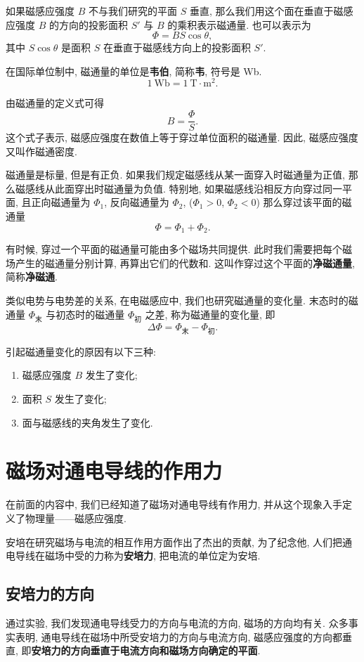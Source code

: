 \documentclass[UTF8,openany,fontset=fandol]{ctexbook}
\theoremstyle{chinesetextbook}
\newcommand{\unit}[1]{\ \mathrm{#1}}
\begin{document}
如果磁感应强度 $B$ 不与我们研究的平面 $S$ 垂直, 那么我们用这个面在垂直于磁感应强度 $B$ 的方向的投影面积 $S'$ 与 $B$ 的乘积表示磁通量. 也可以表示为
\[
\Phi=BS\cos\theta,
\]
其中 $S\cos\theta$ 是面积 $S$ 在垂直于磁感线方向上的投影面积 $S'$.

在国际单位制中, 磁通量的单位是\textbf{韦伯}, 简称\textbf{韦}, 符号是 Wb.
\[
1\unit{Wb}=1\unit{{T}\cdot{m^2}}.
\]

由磁通量的定义式可得
\[
B=\frac{\Phi}{S}.
\]
这个式子表示, 磁感应强度在数值上等于穿过单位面积的磁通量. 因此, 磁感应强度又叫作磁通密度.

磁通量是标量, 但是有正负. 如果我们规定磁感线从某一面穿入时磁通量为正值, 那么磁感线从此面穿出时磁通量为负值. 特别地, 如果磁感线沿相反方向穿过同一平面, 且正向磁通量为 $\Phi_1$, 反向磁通量为 $\Phi_2$, ($\Phi_1>0$, $\Phi_2<0$) 那么穿过该平面的磁通量
\[
\Phi=\Phi_1+\Phi_2.
\]

有时候, 穿过一个平面的磁通量可能由多个磁场共同提供. 此时我们需要把每个磁场产生的磁通量分别计算, 再算出它们的代数和. 这叫作穿过这个平面的\textbf{净磁通量}, 简称\textbf{净磁通}.

类似电势与电势差的关系, 在电磁感应中, 我们也研究磁通量的变化量. 末态时的磁通量 $\Phi_\text{末}$ 与初态时的磁通量 $\Phi_\text{初}$ 之差, 称为磁通量的变化量, 即
\[
\Delta\Phi=\Phi_\text{末}-\Phi_\text{初}.
\]

引起磁通量变化的原因有以下三种:
\begin{enumerate}
\item 磁感应强度 $B$ 发生了变化;
\item 面积 $S$ 发生了变化;
\item 面与磁感线的夹角发生了变化.
\end{enumerate}
\section{磁场对通电导线的作用力}
在前面的内容中, 我们已经知道了磁场对通电导线有作用力, 并从这个现象入手定义了物理量——磁感应强度.

安培在研究磁场与电流的相互作用方面作出了杰出的贡献, 为了纪念他, 人们把通电导线在磁场中受的力称为\textbf{安培力}, 把电流的单位定为安培.
\subsection{安培力的方向}
通过实验, 我们发现通电导线受力的方向与电流的方向, 磁场的方向均有关. 众多事实表明, 通电导线在磁场中所受安培力的方向与电流方向, 磁感应强度的方向都垂直, 即\textbf{安培力的方向垂直于电流方向和磁场方向确定的平面}.
\end{document}
